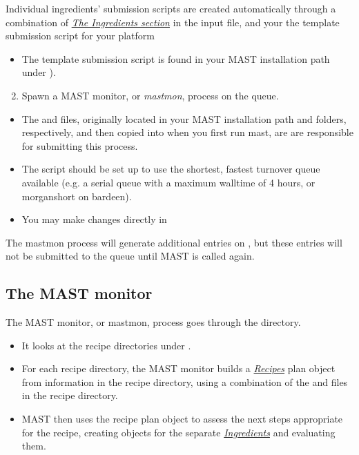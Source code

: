 \documentclass[letterpaper,10pt,english]{sphinxmanual}
\begin{document}
Individual ingredients' submission scripts are created automatically through a combination of {\hyperref[3_1_2_ingredients::doc]{\emph{The Ingredients section}}} in the input file, and your the template submission script for your platform
\begin{itemize}
\item {} 
The template submission script is found in your MAST installation path under ).

\end{itemize}
\begin{enumerate}
\setcounter{enumi}{1}
\item {} 
Spawn a MAST monitor, or \emph{mastmon}, process on the queue.

\end{enumerate}
\begin{itemize}
\item {} 
The  and  files, originally located in your MAST installation path  and  folders, respectively, and then copied into  when you first run mast, are are responsible for submitting this process.

\item {} 
The script should be set up to use the shortest, fastest turnover queue available (e.g. a serial queue with a maximum walltime of 4 hours, or morganshort on bardeen).

\item {} 
You may make changes directly in 

\end{itemize}

The mastmon process will generate additional entries on , but these entries will not be submitted to the queue until MAST is called again.


\subsection{The MAST monitor}
\label{5_0_runningmast:the-mast-monitor}
The MAST monitor, or mastmon, process goes through the  directory.
\begin{itemize}
\item {} 
It looks at the recipe directories under .

\item {} 
For each recipe directory, the MAST monitor builds a {\hyperref[4_0_recipe::doc]{\emph{Recipes}}} plan object from information in the recipe directory, using a combination of the  and  files in the recipe directory.

\item {} 
MAST then uses the recipe plan object to assess the next steps appropriate for the recipe, creating objects for the separate {\hyperref[2_0_ingredients::doc]{\emph{Ingredients}}} and evaluating them.

\end{itemize}
\end{document}
